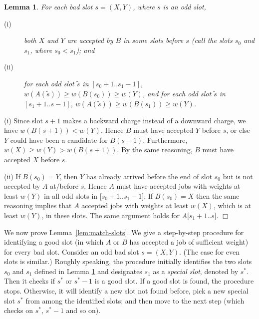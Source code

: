 \documentclass[11pt]{article}
\newtheorem{lemma}{Lemma}[section]
\newcommand{\qed}{\hspace*{\fill}$\Box$\par\medskip}
\newenvironment{proof}{\noindent{\it Proof. }\ignorespaces}{\qed}
\begin{document}
\begin{lemma} \label{lem:badslot}
For each bad slot $s = (X,Y)$, where $s$ is an odd slot,
\begin{description}
\item[(i)]
both $X$ and $Y$ are accepted
by $B$ in some slots before $s$ (call the slots $s_0$
and $s_1$, where $s_0 < s_1$); and
\item[(ii)]
for each odd slot $\tilde{s}$ in $[s_0+1..s_1-1]$,
$w(A(\tilde{s})) \geq w(B(s_0)) \ge w(Y)$, and
for each odd slot $\tilde{s}$ in $[s_1+1..s-1]$,
$w(A(\tilde{s})) \geq w(B(s_1)) \ge w(Y)$.
\end{description}
\end{lemma}
\begin{proof}
(i) Since slot $s+1$ makes a backward charge
instead of a downward charge, we have $w(B(s+1)) < w(Y)$.  
Hence $B$ must have accepted $Y$ before $s$,
or else $Y$ could have been a candidate for $B(s+1)$.
Furthermore, $w(X) \ge w(Y) > w(B(s+1))$.
By the same reasoning, $B$ must have accepted $X$ before $s$.

\noindent (ii)
If $B(s_0)=Y$, then $Y$ has already arrived before the end of 
slot $s_0$ but is not accepted by $A$ at/before $s$.
Hence $A$ must have accepted jobs with weights at least $w(Y)$
in all odd slots in [$s_0+1..s_1-1$].
If $B(s_0)=X$ then the same reasoning implies that 
$A$ accepted jobs with weights at least $w(X)$, which is at
least $w(Y)$, in these slots.
The same argument holds for $A$[$s_1+1..s$]. \end{proof}

We now prove Lemma~\ref{lem:match-slots}.
We give a step-by-step procedure for identifying a good slot 
(in which $A$ or $B$ has accepted a job of sufficient weight) 
for every bad slot.
Consider an odd bad slot $s=(X,Y)$. (The case for even slots
is similar.)  
Roughly speaking, the procedure initially identifies the two slots
$s_0$ and $s_1$ defined in Lemma \ref{lem:badslot}
and designates $s_1$ as a {\em special slot}, denoted by $s^*$.
Then it checks if $s^*$ or $s^*-1$ is a good slot.
If a good slot is found, the procedure stops.
Otherwise, it will identify a new slot not found before,
pick a new special slot $s^*$ from among the
identified slots;
and then move to the next step (which checks on $s^*$, $s^*-1$
and so on).
\end{document}
